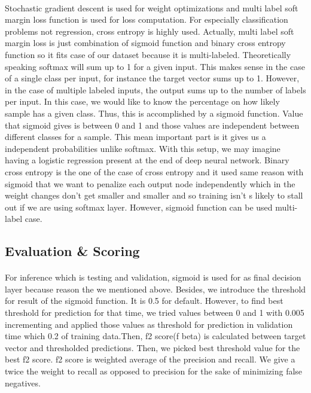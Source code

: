 \paragraph{}Stochastic gradient descent is used for weight optimizations and multi label soft margin loss function is used for loss computation. For especially classification problems not regression, cross entropy is highly used. Actually, multi label soft margin loss is just combination of sigmoid function and binary cross entropy function so it fits case of our dataset because it is multi-labeled. Theoretically speaking softmax will sum up to 1 for a given input. This makes sense in the case of a single class per input, for instance the target vector sums up to 1. However, in the case of multiple labeled inputs, the output sums up to the number of labels per input. In this case, we would like to know the percentage on how likely sample has a given class. Thus, this is accomplished by a sigmoid function. Value that sigmoid gives is between 0 and 1 and those values are independent between different classes for a sample. This mean important part is it gives us a independent probabilities unlike softmax. With this setup, we may imagine having a logistic regression present at the end of deep neural network. Binary cross entropy is the one of the case of cross entropy and it used same reason with sigmoid that we want to penalize each output node independently which in the weight changes don’t get smaller and smaller and so training isn’t s likely to stall out if we are using softmax layer. However, sigmoid function can be used multi-label case.
\subsection{Evaluation \& Scoring}
\paragraph{}For inference which is testing and validation, sigmoid is used for as final decision layer because reason the we mentioned above. Besides, we introduce the threshold for result of the sigmoid function. It is 0.5 for default. However, to find best threshold for prediction for that time, we tried values between 0 and 1 with 0.005 incrementing and applied those values as threshold for prediction in validation time which 0.2 of training data.Then, f2 score(f beta) is calculated between target vector and thresholded predictions. Then, we picked best threshold value for the best f2 score. f2 score is weighted average of the precision and recall. We give a twice the weight to recall as opposed to precision for the sake of minimizing false negatives.   
